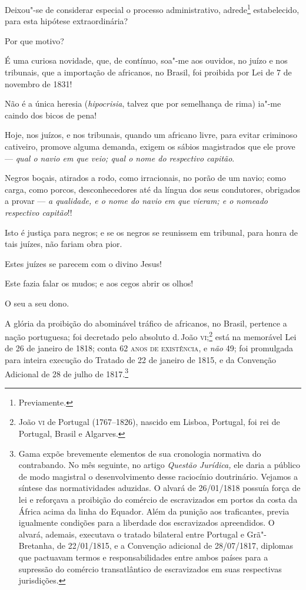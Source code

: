 Deixou"-se de considerar especial o processo administrativo,
adrede\footnote{Previamente.} estabelecido, para esta hipótese
extraordinária?

Por que motivo?

\asterisc

É uma curiosa novidade, que, de contínuo, soa"-me aos ouvidos, no juízo e
nos tribunais, que a importação de africanos, no Brasil, foi proibida
por Lei de 7 de novembro de 1831!

Não é a única heresia (\emph{hipocrisia}, talvez que por semelhança de
rima) ia"-me caindo dos bicos de pena!

Hoje, nos juízos, e nos tribunais, quando um africano livre, para evitar
criminoso cativeiro, promove alguma demanda, exigem os sábios
magistrados que ele prove --- \emph{qual o navio em que veio; qual o nome
do respectivo capitão}.

Negros boçais, atirados a rodo, como irracionais, no porão de um navio;
como carga, como porcos, desconhecedores até da língua dos seus
condutores, obrigados a provar --- \emph{a qualidade, e o nome do navio em
que vieram; e o nomeado respectivo capitão}!!

Isto é justiça para negros; e se os negros se reunissem em tribunal,
para honra de tais juízes, não fariam obra pior.

Estes juízes se parecem com o divino Jesus!

Este fazia falar os mudos; e aos cegos abrir os olhos!

\asterisc

O seu a seu dono.

A glória da proibição do abominável tráfico de africanos, no Brasil,
pertence a nação portuguesa; foi decretado pelo absoluto d.\,João
\textsc{vi};\footnote{João \textsc{vi} de Portugal (1767--1826), nascido em Lisboa,
  Portugal, foi rei de Portugal, Brasil e Algarves.} está na memorável
Lei de 26 de janeiro de 1818; conta 62 \textsc{anos de existência}, e \emph{não}
49; foi promulgada para inteira execução do Tratado de 22 de janeiro de
1815, e da Convenção Adicional de 28 de julho de 1817.\footnote{Gama
  expõe brevemente elementos de sua cronologia normativa do contrabando.
  No mês seguinte, no artigo \emph{Questão Jurídica,} ele daria a
  público de modo magistral o desenvolvimento desse raciocínio
  doutrinário. Vejamos a síntese das normatividades aduzidas. O alvará
  de 26/01/1818 possuía força de lei e reforçava a proibição do comércio
  de escravizados em portos da costa da África acima da linha do
  Equador. Além da punição aos traficantes, previa igualmente condições
  para a liberdade dos escravizados apreendidos. O alvará, ademais,
  executava o tratado bilateral entre Portugal e Grã"-Bretanha, de
  22/01/1815, e a Convenção adicional de 28/07/1817, diplomas que
  pactuavam termos e responsabilidades entre ambos países para a
  supressão do comércio transatlântico de escravizados em suas
  respectivas jurisdições.}

